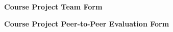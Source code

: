\documentclass[12pt]{article}
\renewcommand{\_}{\kern-1.5pt\textunderscore\kern-1.5pt}
\begin{document}
\textbf{Course Project Team Form}\par


\vspace{\baselineskip}






\vspace{\baselineskip}




\vspace{\baselineskip}



\newpage

\vspace{\baselineskip}
\vspace{\baselineskip}
\textbf{Course Project Peer-to-Peer Evaluation Form}\par


\vspace{\baselineskip}




\end{document}
